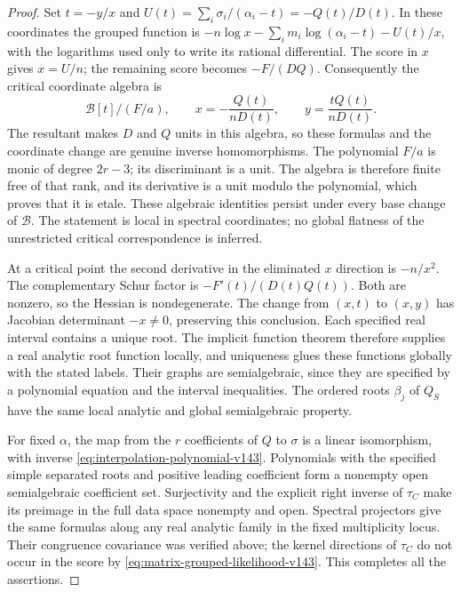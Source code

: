 \begin{proof}
Set \(t=-y/x\) and
\(U(t)=\sum_i\sigma_i/(\alpha_i-t)=-Q(t)/D(t)\).
In these coordinates the grouped function is
\(-n\log x-\sum_i m_i\log(\alpha_i-t)-U(t)/x\),
with the logarithms used only to write its rational differential.
The score in \(x\) gives \(x=U/n\); the remaining score becomes
\(-F/(DQ)\).  Consequently the critical coordinate algebra is
\begin{equation}\label{eq:finite-etale-score-algebra-v143}
 \mathscr B[t]/(F/a),\qquad
 x=-\frac{Q(t)}{nD(t)},\qquad
 y=\frac{tQ(t)}{nD(t)}.
\end{equation}
The resultant makes \(D\) and \(Q\) units in this algebra, so
these formulas and the coordinate change are genuine inverse
homomorphisms.  The polynomial \(F/a\) is monic of degree
\(2r-3\); its discriminant is a unit.  The algebra is therefore
finite free of that rank, and its derivative is a unit modulo the
polynomial, which proves that it is etale.  These algebraic
identities persist under every base change of \(\mathscr B\).
The statement is local in spectral coordinates; no global flatness
of the unrestricted critical correspondence is inferred.

At a critical point the second derivative in the eliminated \(x\)
direction is \(-n/x^2\).  The complementary Schur factor is
\(-F'(t)/(D(t)Q(t))\).  Both are nonzero, so the Hessian is
nondegenerate.  The change from \((x,t)\) to \((x,y)\) has
Jacobian determinant \(-x\ne0\), preserving this conclusion.
Each specified real interval contains a unique root.  The implicit
function theorem therefore supplies a real analytic root function
locally, and uniqueness glues these functions globally with the
stated labels.  Their graphs are semialgebraic, since they are
specified by a polynomial equation and the interval inequalities.
The ordered roots \(\beta_j\) of \(Q_S\) have the same local
analytic and global semialgebraic property.

For fixed \(\alpha\), the map from the \(r\) coefficients of
\(Q\) to \(\sigma\) is a linear isomorphism, with inverse
\eqref{eq:interpolation-polynomial-v143}.  Polynomials with the
specified simple separated roots and positive leading coefficient
form a nonempty open semialgebraic coefficient set.  Surjectivity
and the explicit right inverse of \(\tau_C\) make its preimage
in the full data space nonempty and open.  Spectral projectors give
the same formulas along any real analytic family in the fixed
multiplicity locus.  Their congruence covariance was verified above;
the kernel directions of \(\tau_C\) do not occur in the score
by \eqref{eq:matrix-grouped-likelihood-v143}.  This completes all
the assertions.
\end{proof}

